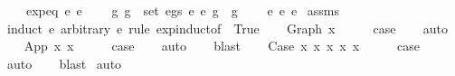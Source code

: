 \begin{isabellebody}
\ \ \ \ {\isachardoublequoteopen}expeq\ e{}\ e{}{\isachardoublequoteclose}\isanewline
\ \ \ \ {\isachardoublequoteopen}{\isasymforall}{\isacharparenleft}{\kern0pt}g{}{\isacharcomma}{\kern0pt}\ g{}{\isacharparenright}{\kern0pt}\ {\isasymin}\ set\ {\isacharparenleft}{\kern0pt}egs\ e{}\ e{}{\isacharparenright}{\kern0pt}{\isachardot}{\kern0pt}\ g{}\ {\isasymsimeq}\ g{}{\isachardoublequoteclose}\isanewline
\ \ \ \ {\isachardoublequoteopen}e{}\ {\isasymsimeq}e\ e{}{\isachardoublequoteclose}\isanewline
%
\isadelimproof
%
\endisadelimproof
%
\isatagproof
{}\isamarkupfalse%
\ assms\isanewline
{}\isamarkupfalse%
\ {\isacharparenleft}{\kern0pt}induct\ e{}\ arbitrary{\isacharcolon}{\kern0pt}\ e{}\ rule{\isacharcolon}{\kern0pt}\ exp{\isachardot}{\kern0pt}induct{\isacharbrackleft}{\kern0pt}of\ {\isachardoublequoteopen}{\isacharpercent}{\kern0pt}{\isacharunderscore}{\kern0pt}{\isachardot}{\kern0pt}\ True{\isachardoublequoteclose}{\isacharbrackright}{\kern0pt}{\isacharparenright}{\kern0pt}\isanewline
\ \ \isamarkupfalse%
\ {\isacharparenleft}{\kern0pt}Graph\ x{\isacharparenright}{\kern0pt}\isanewline
\ \ \isamarkupfalse%
\ \isamarkupfalse%
\ {\isacharquery}{\kern0pt}case\isanewline
\ \ \isamarkupfalse%
\ auto\isanewline
{}\isamarkupfalse%
\isanewline
\ \ \isamarkupfalse%
\ {\isacharparenleft}{\kern0pt}App\ x{}\ x{}{\isacharparenright}{\kern0pt}\isanewline
\ \ \isamarkupfalse%
\ \isamarkupfalse%
\ {\isacharquery}{\kern0pt}case\isanewline
\ \ \isamarkupfalse%
\ auto\isanewline
\ \ \isamarkupfalse%
\ blast\isanewline
{}\isamarkupfalse%
\isanewline
\ \ \isamarkupfalse%
\ {\isacharparenleft}{\kern0pt}Case\ x{}\ x{}\ x{}\ x{}\ x{}{\isacharparenright}{\kern0pt}\isanewline
\ \ \isamarkupfalse%
\ \isamarkupfalse%
\ {\isacharquery}{\kern0pt}case\isanewline
\ \ \isamarkupfalse%
\ auto\isanewline
\ \ \isamarkupfalse%
\ blast\isanewline
{}\isamarkupfalse%
\ auto%
\endisatagproof
{\isafoldproof}%
%
\isadelimproof
\isanewline

\end{isabellebody}
